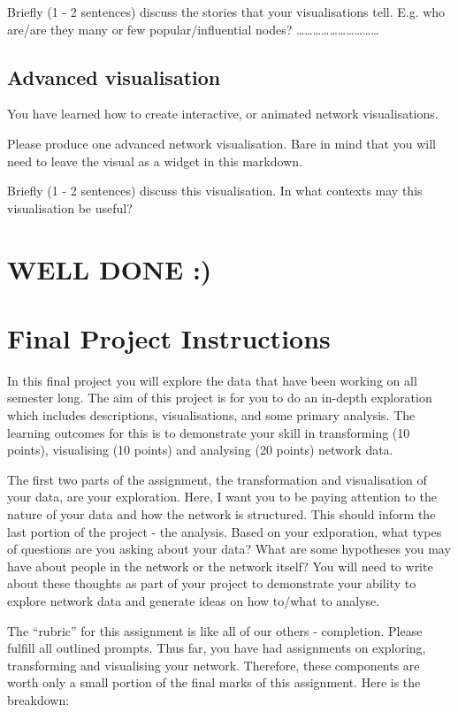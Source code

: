 \documentclass[
  letterpaper,
  DIV=11,
  numbers=noendperiod]{scrreprt}
\begin{document}
Briefly (1 - 2 sentences) discuss the stories that your visualisations
tell. E.g. who are/are they many or few popular/influential nodes?
\ldots\ldots\ldots\ldots\ldots\ldots\ldots\ldots\ldots\ldots{}

\section{Advanced visualisation}\label{advanced-visualisation}

You have learned how to create interactive, or animated network
visualisations.

Please produce one advanced network visualisation. Bare in mind that you
will need to leave the visual as a widget in this markdown.

Briefly (1 - 2 sentences) discuss this visualisation. In what contexts
may this visualisation be useful?

\chapter{WELL DONE :)}\label{well-done}

\chapter{Final Project Instructions}\label{final-project-instructions}

In this final project you will explore the data that have been working
on all semester long. The aim of this project is for you to do an
in-depth exploration which includes descriptions, visualisations, and
some primary analysis. The learning outcomes for this is to demonstrate
your skill in transforming (10 points), visualising (10 points) and
analysing (20 points) network data.

The first two parts of the assignment, the transformation and
visualisation of your data, are your exploration. Here, I want you to be
paying attention to the nature of your data and how the network is
structured. This should inform the last portion of the project - the
analysis. Based on your exlporation, what types of questions are you
asking about your data? What are some hypotheses you may have about
people in the network or the network itself? You will need to write
about these thoughts as part of your project to demonstrate your ability
to explore network data and generate ideas on how to/what to analyse.

The ``rubric'' for this assignment is like all of our others -
completion. Please fulfill all outlined prompts. Thus far, you have had
assignments on exploring, transforming and visualising your network.
Therefore, these components are worth only a small portion of the final
marks of this assignment. Here is the breakdown:
\end{document}
